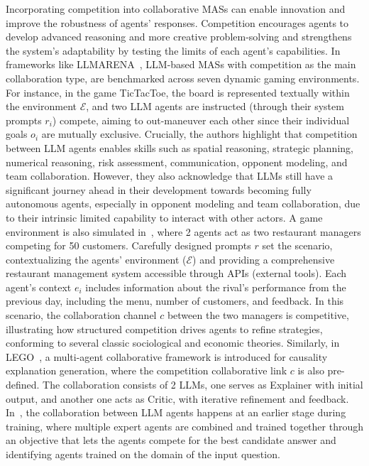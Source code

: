 \documentclass[acmsmall,nonacm]{acmart}
\begin{document}
            Incorporating competition into collaborative MASs can enable innovation and improve the robustness of agents' responses. Competition encourages agents to develop advanced reasoning and more creative problem-solving and strengthens the system's adaptability by testing the limits of each agent’s capabilities. In frameworks like LLMARENA~\cite{chen-etal-2024-llmarena}, LLM-based MASs with competition as the main collaboration type, are benchmarked across seven dynamic gaming environments.  For instance, in the game TicTacToe, the board is represented textually within the environment $\mathcal{E}$, and two LLM agents are instructed (through their system prompts $r_i$) compete, aiming to out-maneuver each other since their individual goals $o_i$ are mutually exclusive. Crucially, the authors highlight that competition between LLM agents enables skills such as spatial reasoning, strategic planning, numerical reasoning, risk assessment, communication, opponent modeling, and team collaboration. However, they also acknowledge that LLMs still have a significant journey ahead in their development towards becoming fully autonomous agents, especially in opponent modeling and team collaboration, due to their intrinsic limited capability to interact with other actors. A game environment is also simulated in~\cite{zhao2024competeai}, where 2 agents act as two restaurant managers competing for 50 customers.  Carefully designed prompts $r$ set the scenario, contextualizing the agents' environment ($\mathcal{E}$) and providing a comprehensive restaurant management system accessible through APIs (external tools). Each agent's context $e_i$ includes information about the rival’s performance from the previous day, including the menu, number of customers, and feedback. In this scenario, the collaboration channel $c$ between the two managers is competitive, illustrating how structured competition drives agents to refine strategies, conforming to several classic sociological and economic theories. Similarly, in LEGO~\cite{he-etal-2023-lego}, a multi-agent collaborative framework is introduced for causality explanation generation, where the competition collaborative link $c$ is also pre-defined. The collaboration consists of 2 LLMs, one serves as Explainer with initial output, and another one acts as Critic, with iterative refinement and feedback. In~\cite{puerto-etal-2023-metaqa}, the collaboration between LLM agents happens at an earlier stage during training, where multiple expert agents are combined and trained together through an objective that lets the agents compete for the best candidate answer and identifying agents trained on the domain of the input question.
\end{document}
